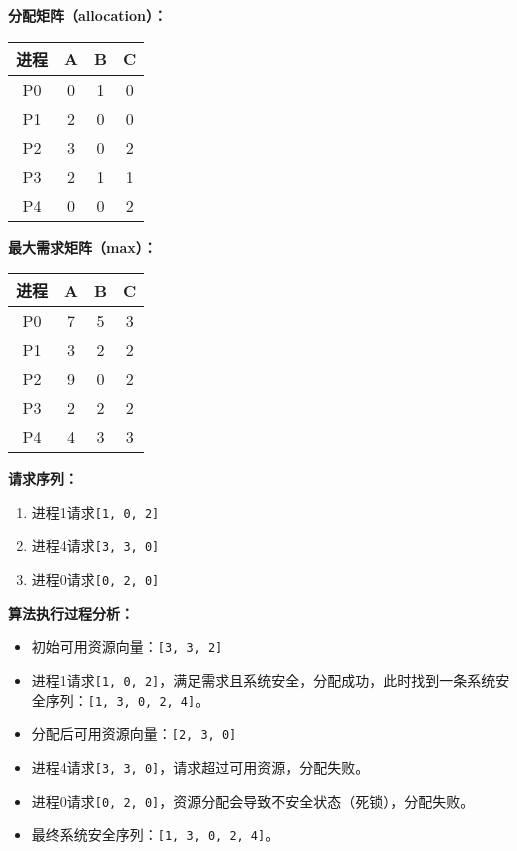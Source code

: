 \documentclass[12pt, a4paper, oneside]{ctexart}
\begin{document}
\textbf{分配矩阵（allocation）：}

\begin{table}[H]
    \centering
    \begin{tabular}{c|ccc}
        \hline
        进程 & A & B & C \\
        \hline
        P0 & 0 & 1 & 0 \\
        P1 & 2 & 0 & 0 \\
        P2 & 3 & 0 & 2 \\
        P3 & 2 & 1 & 1 \\
        P4 & 0 & 0 & 2 \\
        \hline
    \end{tabular}
\end{table}

\textbf{最大需求矩阵（max）：}

\begin{table}[H]
    \centering
    \begin{tabular}{c|ccc}
        \hline
        进程 & A & B & C \\
        \hline
        P0 & 7 & 5 & 3 \\
        P1 & 3 & 2 & 2 \\
        P2 & 9 & 0 & 2 \\
        P3 & 2 & 2 & 2 \\
        P4 & 4 & 3 & 3 \\
        \hline
    \end{tabular}
\end{table}

\textbf{请求序列：}

\begin{enumerate}
    \item 进程1请求\texttt{[1, 0, 2]}
    \item 进程4请求\texttt{[3, 3, 0]}
    \item 进程0请求\texttt{[0, 2, 0]}
\end{enumerate}

\textbf{算法执行过程分析：}

\begin{itemize}
    \item 初始可用资源向量：\texttt{[3, 3, 2]}
    \item 进程1请求\texttt{[1, 0, 2]}，满足需求且系统安全，分配成功，此时找到一条系统安全序列：\texttt{[1, 3, 0, 2, 4]}。
    \item 分配后可用资源向量：\texttt{[2, 3, 0]}
    \item 进程4请求\texttt{[3, 3, 0]}，请求超过可用资源，分配失败。
    \item 进程0请求\texttt{[0, 2, 0]}，资源分配会导致不安全状态（死锁），分配失败。
    \item 最终系统安全序列：\texttt{[1, 3, 0, 2, 4]}。
\end{itemize}
\end{document}
